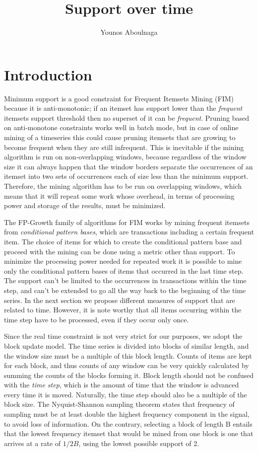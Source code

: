 \documentclass[11pt]{llncs} %
\title{Support over time}
\author{Younos Aboulnaga\inst{1}}
\institute{David R. Cheriton School of Computer Science, University of Waterloo, Waterloo, ON, Canada \email{yaboulna@uwaterloo.ca}}
\begin{document}
\maketitle
\section{Introduction}
Minimum support is a good constraint for Frequent Itemsets Mining (FIM) because it is anti-monotonic; if an itemset has support lower than the \emph{frequent} itemsets support threshold then no superset of it can be \emph{frequent}. Pruning based on anti-monotone constraints works well in batch mode, but in case of online mining of a timeseries this could cause pruning itemsets that are growing to become frequent when they are still infrequent. This is inevitable if the mining algorithm is run on non-overlapping windows, because regardless of the window size it can always happen that the window borders separate the occurrences of an itemset into two sets of occurrences each of size less than the minimum support. Therefore, the mining algorithm has to be run on overlapping windows, which means that it will repeat some work whose overhead, in terms of processing power and storage of the results, must be minimized. 

The FP-Growth family of algorithms for FIM works by mining frequent itemsets from \emph{conditional pattern bases}, which are  transactions including a certain frequent item. The choice of items for which to create the conditional pattern base and proceed with the mining can be done using a metric other than support. To minimize the processing power needed for repeated work it is possible to mine only the conditional pattern bases of items that occurred in the last time step. The support can't be limited to the occurrences in transactions within the time step, and can't be extended to go all the way back to the beginning of the time series. In the next section we propose different measures of support that are related to time. However, it is note worthy that all items occurring within the time step have to be processed, even if they occur only once.

Since the real time constraint is not very strict for our purposes, we adopt the block update model. The time series is divided into blocks of similar length, and the window size must be a multiple of this block length. Counts of items are kept for each block, and thus counts of any window can be very quickly calculated by summing the counts of the blocks forming it. Block length should not be confused with the \emph{time step}, which is the amount of time that the window is advanced every time it is moved. Naturally, the time step should also be a multiple of the block size. The Nyquist-Shannon sampling theorem states that frequency of sampling must be at least double the highest frequency component in the signal, to avoid loss of information. On the contrary, selecting a block of length B entails that the lowest frequency itemset that would be mined from one block is one that arrives at a rate of $1/2B$, using the lowest possible support of 2.
\end{document}

